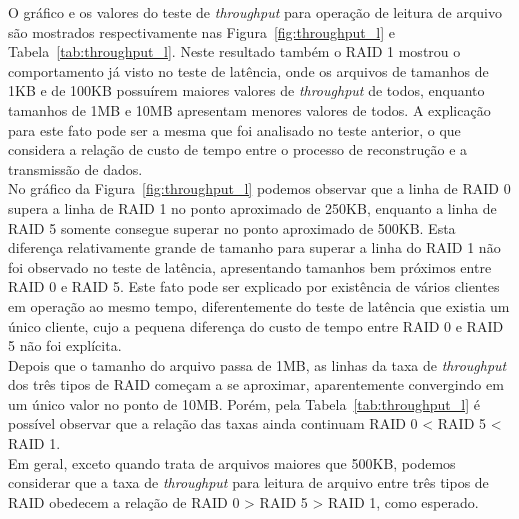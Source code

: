 	O gráfico e os valores do teste de \textit{throughput} para operação de leitura de arquivo são mostrados respectivamente nas Figura~\ref{fig:throughput_l} e Tabela~\ref{tab:throughput_l}.	
	Neste resultado também o RAID 1 mostrou o comportamento já visto no teste de latência, onde os arquivos de tamanhos de 1KB e de 100KB possuírem maiores valores de \textit{throughput} de todos, enquanto tamanhos de 1MB e 10MB apresentam menores valores de todos. A explicação para este fato pode ser a mesma que foi analisado no teste anterior, o que considera a relação de custo de tempo entre o processo de reconstrução e a transmissão de dados.
	\\
	
	No gráfico da Figura~\ref{fig:throughput_l} podemos observar que a linha de RAID 0 supera a linha de RAID 1 no ponto aproximado de 250KB, enquanto a linha de  RAID 5 somente consegue superar no ponto aproximado de 500KB. 
	Esta diferença relativamente grande de tamanho para superar a linha do RAID 1 não foi observado no teste de latência, apresentando tamanhos bem próximos entre RAID 0 e RAID 5. Este fato pode ser explicado por existência de vários clientes em operação ao mesmo tempo, diferentemente do teste de latência que existia um único cliente, cujo a pequena diferença do custo de tempo entre RAID 0 e RAID 5 não foi explícita.
	\\
	
	Depois que o tamanho do arquivo passa de 1MB, as linhas da taxa de \textit{throughput} dos três tipos de RAID começam a se aproximar, aparentemente convergindo em um único valor no ponto de 10MB. Porém, pela Tabela~\ref{tab:throughput_l} é possível observar que a relação das taxas ainda continuam RAID 0 < RAID 5 < RAID 1.
	\\
	
	Em geral, exceto quando trata de arquivos maiores que 500KB, podemos considerar que a taxa de \textit{throughput} para leitura de arquivo entre três tipos de RAID obedecem a relação de RAID 0 > RAID 5 > RAID 1, como esperado.
	\\
	
